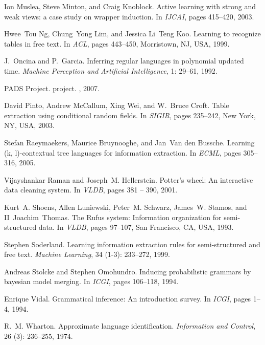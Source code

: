\documentclass[natbib]{sigplanconf}
\begin{document}
\begin{thebibliography}{37}
Ion Muslea, Steve Minton, and Craig Knoblock.
\newblock Active learning with strong and weak views: a case study on wrapper
  induction.
\newblock In \emph{{IJCAI}}, pages 415--420, 2003.

Hwee~Tou Ng, Chung~Yong Lim, and Jessica Li~Teng Koo.
\newblock Learning to recognize tables in free text.
\newblock In \emph{{ACL}}, pages 443--450, Morristown, NJ, USA, 1999.

J.~Oncina and P.~Garcia.
\newblock Inferring regular languages in polynomial updated time.
\newblock \emph{Machine Perception and Artificial Intelligence}, 1:
  29--61, 1992.

PADS Project.
 project.
, 2007.

David Pinto, Andrew McCallum, Xing Wei, and W.~Bruce Croft.
\newblock Table extraction using conditional random fields.
\newblock In \emph{SIGIR}, pages 235--242, New York, NY, USA, 2003.

Stefan Raeymaekers, Maurice Bruynooghe, and Jan~Van den Bussche.
\newblock Learning (k, l)-contextual tree languages for information extraction.
\newblock In \emph{{ECML}}, pages 305--316, 2005.

Vijayshankar Raman and Joseph~M. Hellerstein.
\newblock Potter's wheel: An interactive data cleaning system.
\newblock In \emph{{VLDB}}, pages 381 -- 390, 2001.

Kurt~A. Shoens, Allen Luniewski, Peter~M. Schwarz, James~W. Stamos, and
  II~Joachim~Thomas.
\newblock The {Rufus} system: Information organization for semi-structured
  data.
\newblock In \emph{{VLDB}}, pages 97--107, San Francisco, CA, USA, 1993.

Stephen Soderland.
\newblock Learning information extraction rules for semi-structured and free
  text.
\newblock \emph{Machine Learning}, 34 (1-3): 233--272, 1999.

Andreas Stolcke and Stephen Omohundro.
\newblock Inducing probabilistic grammars by bayesian model merging.
\newblock In \emph{{ICGI}}, pages 106--118, 1994.

Enrique Vidal.
\newblock Grammatical inference: An introduction survey.
\newblock In \emph{{ICGI}}, pages 1--4, 1994.

R.~M. Wharton.
\newblock Approximate language identification.
\newblock \emph{Information and Control}, 26 (3): 236--255,
  1974.

\end{thebibliography}
\end{document}
